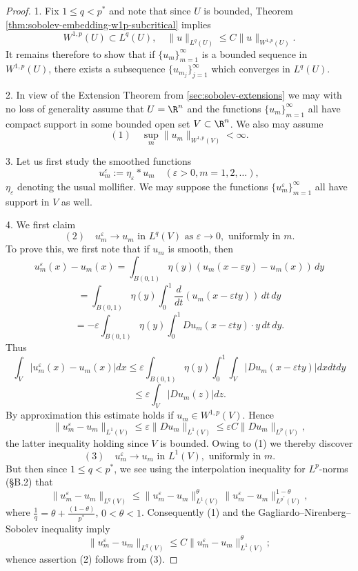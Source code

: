 \begin{proof}
1. Fix $1 \le q < p^*$ and note that since $U$ is bounded, Theorem \ref{thm:sobolev-embedding-w1p-subcritical} implies
$$W^{1,p}(U) \subset L^q(U), \quad \|u\|_{L^q(U)} \le C\|u\|_{W^{1,p}(U)}.$$
It remains therefore to show that if $\{u_m\}_{m=1}^\infty$ is a bounded sequence in $W^{1,p}(U)$, there exists a subsequence $\{u_{m_j}\}_{j=1}^\infty$ which converges in $L^q(U)$.

2. In view of the Extension Theorem from \cref{sec:sobolev-extensions} we may with no loss of generality assume that $U = \R^n$ and the functions $\{u_m\}_{m=1}^\infty$ all have compact support in some bounded open set $V \subset \R^n$. We also may assume
$$(1) \quad \sup_m \|u_m\|_{W^{1,p}(V)} < \infty.$$

3. Let us first study the smoothed functions
$$u_m^\varepsilon := \eta_\varepsilon * u_m \quad (\varepsilon > 0, m = 1,2,\ldots),$$
$\eta_\varepsilon$ denoting the usual mollifier. We may suppose the functions $\{u_m^\varepsilon\}_{m=1}^\infty$ all have support in $V$ as well.

4. We first claim
$$(2) \quad u_m^\varepsilon \to u_m \text{ in } L^q(V) \text{ as } \varepsilon \to 0, \text{ uniformly in } m.$$
To prove this, we first note that if $u_m$ is smooth, then
$$u_m^\varepsilon(x) - u_m(x) = \int_{B(0,1)} \eta(y)(u_m(x-\varepsilon y) - u_m(x)) \, dy$$
$$= \int_{B(0,1)} \eta(y) \int_0^1 \frac{d}{dt}(u_m(x - \varepsilon ty)) \, dt\, dy$$
$$= -\varepsilon \int_{B(0,1)} \eta(y) \int_0^1 Du_m(x - \varepsilon ty) \cdot y \, dt\, dy.$$
Thus
$$\int_V |u_m^\varepsilon(x) - u_m(x)| dx \le \varepsilon \int_{B(0,1)} \eta(y) \int_0^1 \int_V |Du_m(x - \varepsilon ty)| dx dt dy$$
$$\le \varepsilon \int_V |Du_m(z)| dz.$$
By approximation this estimate holds if $u_m \in W^{1,p}(V)$. Hence
$$\|u_m^\varepsilon - u_m\|_{L^1(V)} \le \varepsilon\|Du_m\|_{L^1(V)} \le \varepsilon C\|Du_m\|_{L^p(V)},$$
the latter inequality holding since $V$ is bounded. Owing to (1) we thereby discover
$$(3) \quad u_m^\varepsilon \to u_m \text{ in } L^1(V), \text{ uniformly in } m.$$
But then since $1 \le q < p^*$, we see using the interpolation inequality for $L^p$-norms (§B.2) that
$$\|u_m^\varepsilon - u_m\|_{L^q(V)} \le \|u_m^\varepsilon - u_m\|_{L^1(V)}^\theta \|u_m^\varepsilon - u_m\|_{L^{p^*}(V)}^{1-\theta},$$
where $\frac{1}{q} = \theta + \frac{(1-\theta)}{p^*}$, $0 < \theta < 1$. Consequently (1) and the Gagliardo--Nirenberg--Sobolev inequality imply
$$\|u_m^\varepsilon - u_m\|_{L^q(V)} \le C\|u_m^\varepsilon - u_m\|_{L^1(V)}^\theta;$$
whence assertion (2) follows from (3).


\end{proof}
